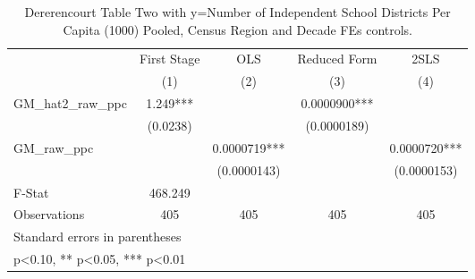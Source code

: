 \begin{table}[htbp]\centering
\def\sym#1{\ifmmode^{#1}\else\(^{#1}\)\fi}
\caption{Dererencourt Table Two with y=Number of Independent School Districts Per Capita (1000) Pooled, Census Region and Decade FEs controls.}
\begin{tabular}{l*{4}{c}}
\toprule
                    & First Stage   &         OLS   &Reduced Form   &        2SLS   \\
                    &\multicolumn{1}{c}{(1)}   &\multicolumn{1}{c}{(2)}   &\multicolumn{1}{c}{(3)}   &\multicolumn{1}{c}{(4)}   \\
\midrule
GM\_hat2\_raw\_ppc     &       1.249***&               &   0.0000900***&               \\
                    &    (0.0238)   &               & (0.0000189)   &               \\
\addlinespace
GM\_raw\_ppc          &               &   0.0000719***&               &   0.0000720***\\
                    &               & (0.0000143)   &               & (0.0000153)   \\
\midrule
F-Stat              &     468.249   &               &               &               \\
Observations        &         405   &         405   &         405   &         405   \\
\bottomrule
\multicolumn{5}{l}{\footnotesize Standard errors in parentheses}\\
\multicolumn{5}{l}{\footnotesize * p<0.10, ** p<0.05, *** p<0.01}\\
\end{tabular}
\end{table}
